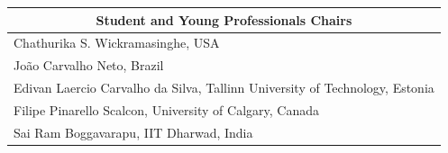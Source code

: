 \begin{center}
\begin{tabular}{l}
 \\
\multicolumn{1}{c}{\textbf{Student and Young Professionals Chairs}}\\
\midrule
Chathurika S. Wickramasinghe, USA \\
Jo\~ao Carvalho Neto, Brazil\\
Edivan Laercio Carvalho da Silva, Tallinn University of Technology, Estonia \\
Filipe Pinarello Scalcon, University of Calgary, Canada \\
Sai Ram Boggavarapu, IIT Dharwad, India \\
\end{tabular}
\end{center}


